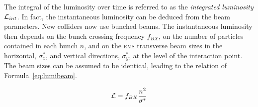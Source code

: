 	The integral of the luminosity over time is referred to as the \textit{integrated luminosity} $\mathcal{L}_{int}$. In fact, the instantaneous luminosity can be deduced from the beam parameters. New colliders now use bunched beams. The instantaneous luminosity then depends on the bunch crossing frequency $f_{BX}$, on the number of particles contained in each bunch $n$, and on the \textsc{rms} transverse beam sizes in the horizontal, $\sigma^*_x$, and vertical directions, $\sigma^*_y$, at the level of the interaction point. The beam sizes  can be assumed to be identical, leading to the relation of Formula~\ref{eq:lumibeam}.
	
	\begin{equation}
		\label{eq:lumibeam}
		\mathcal{L} = f_{BX}\frac{n^2}{\sigma^*}
	\end{equation}
	
\begingroup\setlength{\intextsep}{0pt}\setlength{\columnsep}{15pt}
	
